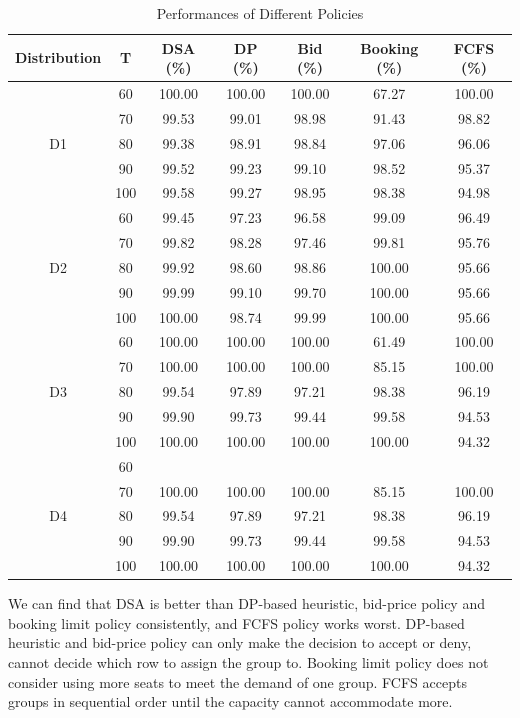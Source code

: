 \begin{table}[h]
  \centering
  \caption{Performances of Different Policies}
  \begin{tabular}{|c|c|c|c|c|c|c|}
  \hline
  Distribution & T & DSA (\%) & DP (\%) & Bid (\%) & Booking (\%) & FCFS (\%) \\
  \hline
  \multirow{5}{*}{D1} & 60 & 100.00 & 100.00 & 100.00 & 67.27 & 100.00 \\
  & 70    & 99.53 & 99.01 & 98.98 & 91.43 & 98.82 \\
  & 80    & 99.38 & 98.91 & 98.84 & 97.06 & 96.06 \\
  & 90    & 99.52 & 99.23 & 99.10 & 98.52 & 95.37 \\
  & 100   & 99.58 & 99.27 & 98.95 & 98.38 & 94.98 \\
  \hline
  \multirow{5}{*}{D2} & 60  & 99.45 & 97.23 & 96.58 & 99.09 & 96.49 \\
     & 70   & 99.82 & 98.28 & 97.46 & 99.81 & 95.76 \\
     & 80   & 99.92 & 98.60 & 98.86 & 100.00 & 95.66 \\
     & 90   & 99.99 & 99.10 & 99.70 & 100.00 & 95.66 \\
     & 100  & 100.00 & 98.74 & 99.99 & 100.00 & 95.66 \\
  \hline
  \multirow{5}{*}{D3} & 60  & 100.00 & 100.00 & 100.00 & 61.49 & 100.00 \\
     & 70  & 100.00 & 100.00 & 100.00 & 85.15 & 100.00 \\
     & 80  & 99.54 & 97.89 & 97.21 & 98.38 & 96.19 \\
     & 90  & 99.90 & 99.73 & 99.44 & 99.58 & 94.53 \\
     & 100 & 100.00 & 100.00 & 100.00 & 100.00 & 94.32 \\
  \hline
    \multirow{5}{*}{D4} & 60  &  &  &  &  &  \\
     & 70  & 100.00 & 100.00 & 100.00 & 85.15 & 100.00 \\
     & 80  & 99.54 & 97.89 & 97.21 & 98.38 & 96.19 \\
     & 90  & 99.90 & 99.73 & 99.44 & 99.58 & 94.53 \\
     & 100 & 100.00 & 100.00 & 100.00 & 100.00 & 94.32 \\
  \hline
  \end{tabular}
\end{table}

We can find that DSA is better than DP-based heuristic, bid-price policy and booking limit policy consistently, and FCFS policy works worst. DP-based heuristic and bid-price policy can only make the decision to accept or deny, cannot decide which row to assign the group to. Booking limit policy does not consider using more seats to meet the demand of one group. FCFS accepts groups in sequential order until the capacity cannot accommodate more.

